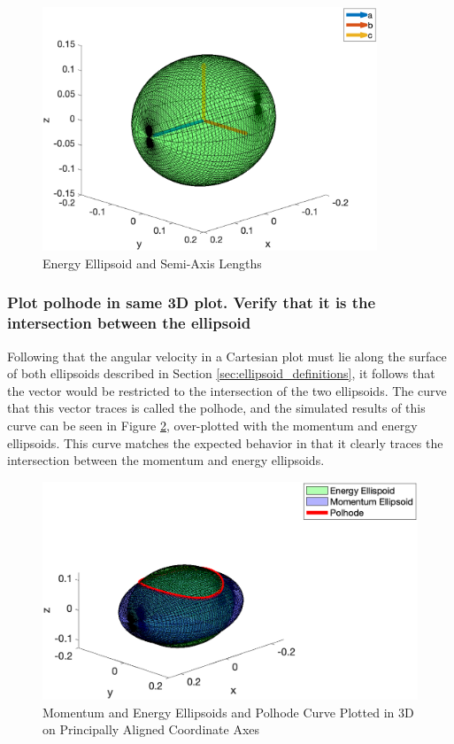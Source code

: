 \begin{figure}[H]
    \centering
    \includegraphics[width = 10cm]{Images/energy_axes_random.png}
    \caption{Energy Ellipsoid and Semi-Axis Lengths}
    \label{fig:energy_axis_verification}
\end{figure}

\subsubsection{Plot polhode in same 3D plot. Verify that it is the intersection between the ellipsoid}

Following that the angular velocity in a Cartesian plot must lie along the surface of both ellipsoids described in Section \ref{sec:ellipsoid_definitions}, it follows that the vector would be restricted to the intersection of the two ellipsoids. The curve that this vector traces is called the polhode, and the simulated results of this curve can be seen in Figure \ref{fig:ellipsoid_super_plot}, over-plotted with the momentum and energy ellipsoids. This curve matches the expected behavior in that it clearly traces the intersection between the momentum and energy ellipsoids. 

\begin{figure}[H]
    \centering
    \includegraphics[width = 12cm] {Images/ellipsoid_polhode_random.png}
    \caption{Momentum and Energy Ellipsoids and Polhode Curve Plotted in 3D on Principally Aligned Coordinate Axes}
    \label{fig:ellipsoid_super_plot}
\end{figure}

